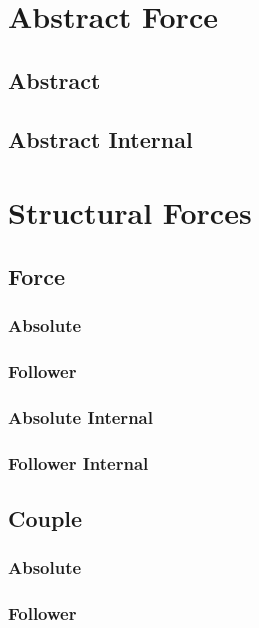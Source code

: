 \section{Abstract Force}

\subsection{Abstract}

\subsection{Abstract Internal}

\section{Structural Forces}

\subsection{Force}

\subsubsection{Absolute}

\subsubsection{Follower}

\subsubsection{Absolute Internal}

\subsubsection{Follower Internal}

\subsection{Couple}

\subsubsection{Absolute}

\subsubsection{Follower}

